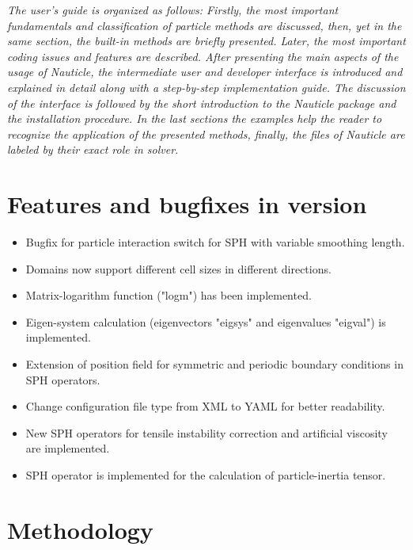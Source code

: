 \documentclass[a4paper,12pt,openany]{book}
\theoremstyle{break}
\begin{document}
\textit{The user's guide is organized as follows: Firstly, the most important fundamentals and classification of particle methods are discussed, then, yet in the same section, the built-in methods are briefly presented. Later, the most important coding issues and features are described. After presenting the main aspects of the usage of Nauticle, the intermediate user and developer interface is introduced and explained in detail along with a step-by-step implementation guide. The discussion of the interface is followed by the short introduction to the Nauticle package and the installation procedure. In the last sections the examples help the reader to recognize the application of the presented methods, finally, the files of Nauticle are labeled by their exact role in solver.}

\section{Features and bugfixes in version \nauticleversion}
\begin{itemize}
  \item Bugfix for particle interaction switch for SPH with variable smoothing length.
  \item Domains now support different cell sizes in different directions.
  \item Matrix-logarithm function ("logm") has been implemented.
  \item Eigen-system calculation (eigenvectors "eigsys" and eigenvalues "eigval") is implemented.
  \item Extension of position field for symmetric and periodic boundary conditions in SPH operators.
  \item Change configuration file type from XML to YAML for better readability.
  \item New SPH operators for tensile instability correction and artificial viscosity are implemented.
  \item SPH operator is implemented for the calculation of particle-inertia tensor.
\end{itemize}

\section{Methodology}
\end{document}
